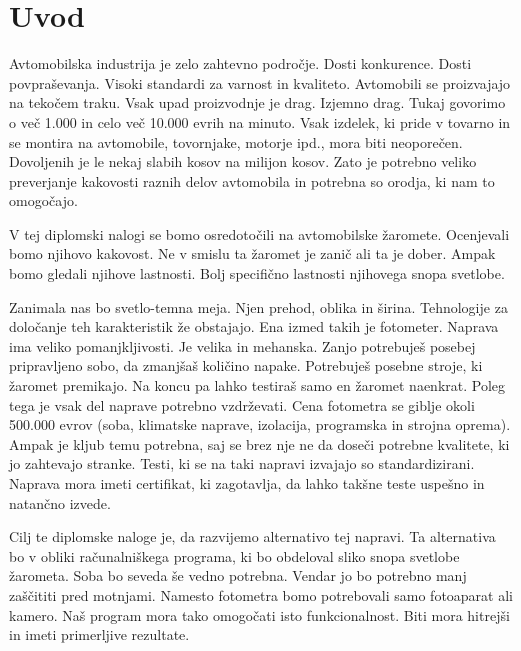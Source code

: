 \documentclass[oneside, a4paper, 12pt]{book}
\newcommand{\clearemptydoublepage}{\newpage{\pagestyle{empty}\cleardoublepage}}
\begin{document}
\clearemptydoublepage

\mainmatter
\setcounter{page}{1}
\pagestyle{fancy}

\chapter{Uvod}
Avtomobilska industrija je zelo zahtevno področje. Dosti konkurence. 
Dosti povpraševanja. Visoki standardi za varnost in kvaliteto. 
Avtomobili se proizvajajo na tekočem traku. Vsak upad proizvodnje 
je drag. Izjemno drag. Tukaj govorimo o več 1.000 in celo več 10.000 
evrih na minuto. Vsak izdelek, ki pride v tovarno in se montira na 
avtomobile, tovornjake, motorje ipd., mora biti neoporečen. Dovoljenih 
je le nekaj slabih kosov na milijon kosov. Zato je potrebno veliko 
preverjanje kakovosti raznih delov avtomobila in potrebna so orodja, 
ki nam to omogočajo.

V tej diplomski nalogi se bomo osredotočili na avtomobilske žaromete. 
Ocenjevali bomo njihovo kakovost. Ne v smislu ta žaromet je zanič ali 
ta je dober. Ampak bomo gledali njihove lastnosti. Bolj specifično 
lastnosti njihovega snopa svetlobe.

Zanimala nas bo svetlo-temna meja. Njen prehod, oblika in širina. 
Tehnologije za določanje teh karakteristik že obstajajo. Ena izmed 
takih je fotometer. Naprava ima veliko pomanjkljivosti. Je velika in 
mehanska. Zanjo potrebuješ posebej pripravljeno sobo, da zmanjšaš količino 
napake. Potrebuješ posebne stroje, ki žaromet premikajo. Na koncu pa 
lahko testiraš samo en žaromet naenkrat. Poleg tega je vsak del 
naprave potrebno vzdrževati. Cena fotometra se giblje okoli 500.000 evrov
(soba, klimatske naprave, izolacija, programska in strojna oprema).
Ampak je kljub temu potrebna, saj se brez nje ne da doseči potrebne 
kvalitete, ki jo zahtevajo stranke. Tes\-ti, ki se na taki napravi 
izvajajo so standardizirani. Naprava mora imeti certifikat, ki zagotavlja, 
da lahko takšne teste uspešno in natančno izvede.

Cilj te diplomske naloge je, da razvijemo alternativo tej napravi. 
Ta alternativa bo v obliki računalniškega programa, ki bo obdeloval 
sliko snopa svetlobe žarometa. Soba bo seveda še vedno potrebna. 
Vendar jo bo potrebno manj zaščititi pred motnjami. Namesto fotometra 
bomo potrebovali samo fotoaparat ali kamero. Naš program mora tako 
omogočati isto funkcionalnost. Biti mora hitrejši in imeti primerljive 
rezultate.
\end{document}
